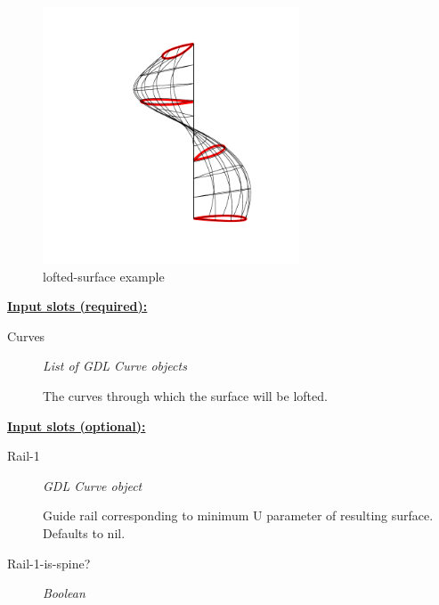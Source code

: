 \documentclass [11pt]{book}
\begin{document}
\begin{itemize}
\begin{figure}
\begin{center}
\includegraphics[width=3in,height=3in]{../images/example-lofted-surface.pdf}
\end{center}

\caption{lofted-surface example}

\label{fig:lofted-surface}

\end{figure}





\textbf{
\underline{Input slots (required):}}

\begin{description}

\item [Curves]
\emph{List of GDL Curve objects}

 The curves through which the surface will be lofted.




\end{description}






\textbf{
\underline{Input slots (optional):}}

\begin{description}

\item [Rail-1]
\emph{GDL Curve object}

 Guide rail corresponding to minimum U parameter of
resulting surface. Defaults to nil.




\item [Rail-1-is-spine?]
\emph{Boolean}


\end{description}
\end{itemize}
\end{document}
